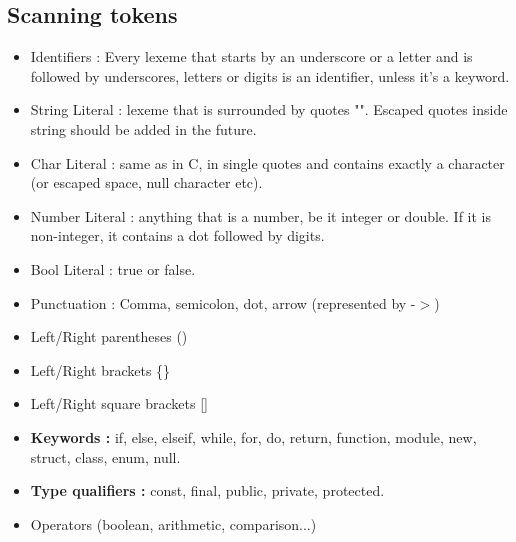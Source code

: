 \documentclass[a4paper, 12pt]{article}
\begin{document}
	\subsection{Scanning tokens}
	\begin{itemize}
		\item Identifiers : Every lexeme that starts by an underscore or a letter and is followed by underscores, letters or digits is an identifier, unless it's a keyword.
		\item String Literal : lexeme that is surrounded by quotes "". Escaped quotes inside string should be added in the future.
		\item Char Literal : same as in C, in single quotes and contains exactly a character (or escaped space, null character etc).
		\item Number Literal : anything that is a number, be it integer or double. If it is non-integer, it contains a dot followed by digits.
		\item Bool Literal : true or false.
		\item Punctuation : Comma, semicolon, dot, arrow (represented by -$>$)
		\item Left/Right parentheses ()
		\item Left/Right brackets \{\}
		\item Left/Right square brackets []
		\item \textbf{Keywords : }if, else, elseif, while, for, do, return, function, module, new, struct, class, enum, null.
		\item \textbf{Type qualifiers : } const, final, public, private, protected.
		\item Operators (boolean, arithmetic, comparison...)

	\end{itemize}

	
\end{document}
